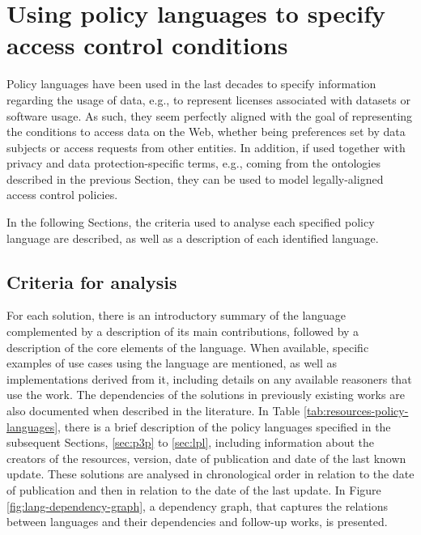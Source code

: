 \section{Using policy languages to specify access control conditions}
\label{sec:sota_policies}
Policy languages have been used in the last decades to specify information regarding the usage of data, e.g., to represent licenses associated with datasets or software usage.
As such, they seem perfectly aligned with the goal of representing the conditions to access data on the Web, whether being preferences set by data subjects or access requests from other entities.
In addition, if used together with privacy and data protection-specific terms, e.g., coming from the ontologies described in the previous Section, they can be used to model legally-aligned access control policies.

In the following Sections, the criteria used to analyse each specified policy language are described, as well as a description of each identified language.

\subsection{Criteria for analysis}
\label{sec:sota_policies_criteria}

For each solution, there is an introductory summary of the language complemented by a description of its main contributions, followed by a description of the core elements of the language. When available, specific examples of use cases using the language are mentioned, as well as implementations derived from it, including details on any available reasoners that use the work. The dependencies of the solutions in previously existing works are also documented when described in the literature. In Table \ref{tab:resources-policy-languages}, there is a brief description of the policy languages specified in the subsequent Sections, \ref{sec:p3p} to \ref{sec:lpl}, including information about the creators of the resources, version, date of publication and date of the last known update. These solutions are analysed in chronological order in relation to the date of publication and then in relation to the date of the last update. In Figure \ref{fig:lang-dependency-graph}, a dependency graph, that captures the relations between languages and their dependencies and follow-up works, is presented.

